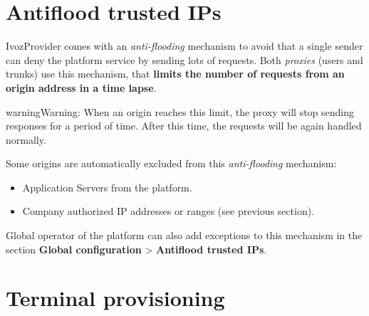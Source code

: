 \documentclass[letterpaper,10pt,english]{sphinxmanual}
\begin{document}
\section{Antiflood trusted IPs}
\label{platform/antiflood::doc}\label{platform/antiflood:antiflood-trusted-ips}\label{platform/antiflood:id1}
IvozProvider comes with an \emph{anti-flooding} mechanism to avoid that a single
sender can deny the platform service by sending lots of requests. Both \emph{proxies}
(users and trunks) use this mechanism, that \textbf{limits the number of requests
from an origin address in a time lapse}.

\begin{notice}{warning}{Warning:}
When an origin reaches this limit, the proxy will stop sending
responses for a period of time. After this time, the requests will be again
handled normally.
\end{notice}

Some origins are automatically excluded from this \emph{anti-flooding} mechanism:
\begin{itemize}
\item {} 
Application Servers from the platform.

\item {} 
Company authorized IP addresses or ranges (see previous section).

\end{itemize}

Global operator of the platform can also add exceptions to this mechanism in
the section \textbf{Global configuration} \textgreater{} \textbf{Antiflood trusted IPs}.



\section{Terminal provisioning}
\label{platform/terminal_provisioning:terminal-provisioning}\label{platform/terminal_provisioning::doc}\label{platform/terminal_provisioning:provisioning}
\end{document}
